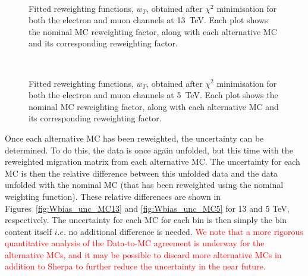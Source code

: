 \begin{figure}[h]
  \centering
   \\
  \caption{Fitted reweighting functions, $w_{T}$, obtained after $\chi^2$ minimisation for both the electron and muon channels at 13~TeV. Each plot shows the nominal MC reweighting factor, along with each alternative MC and its corresponding reweighting factor.}
  \label{fig:WMC_RewFactor13}
\end{figure}

\begin{figure}[h]
  \centering
   \\
  \caption{Fitted reweighting functions, $w_{T}$, obtained after $\chi^2$ minimisation for both the electron and muon channels at 5~TeV. Each plot shows the nominal MC reweighting factor, along with each alternative MC and its corresponding reweighting factor.}
  \label{fig:WMC_RewFactor5}
\end{figure}

Once each alternative MC has been reweighted, the uncertainty can be determined. To do this, the data is once again unfolded, but this time with the reweighted migration matrix from each alternative MC. The uncertainty for each MC is then the relative difference between this unfolded data and the data unfolded with the nominal MC (that has been reweighted using the nominal weighting function). These relative differences are shown in Figures~\ref{fig:Wbias_unc_MC13} and \ref{fig:Wbias_unc_MC5} for 13 and 5 TeV, respectively. The uncertainty for each MC for each bin is then simply the bin content itself $i.e.$ no additional difference is needed.
\textcolor{red}{We note that a more rigorous quantitative analysis of the Data-to-MC agreement is underway for the alternative MCs, and it may be possible to discard more alternative MCs in addition to Sherpa to further reduce the uncertainty in the near future.}


